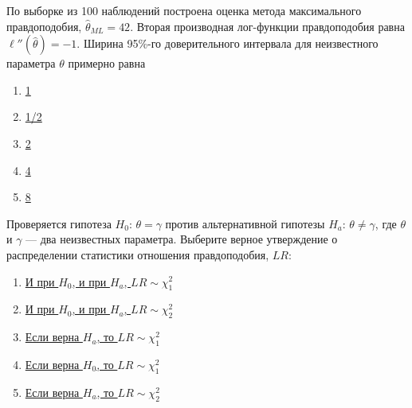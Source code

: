 \documentclass[t]{beamer}
\begin{document}
 \begin{frame} \label{37} 
\begin{block}{37} 

По выборке из 100 наблюдений построена оценка метода максимального правдоподобия, $\hat \theta_{ML} = 42$. Вторая производная лог-функции правдоподобия равна $\ell''(\hat\theta) = -1$. Ширина 95\%-го доверительного интервала для неизвестного параметра $\theta$ примерно равна
  


 \end{block} 
\begin{enumerate} 
\item[] \hyperlink{37-No}{\beamergotobutton{} 1}
\item[] \hyperlink{37-No}{\beamergotobutton{} 1/2}
\item[] \hyperlink{37-No}{\beamergotobutton{} 2}
\item[] \hyperlink{37-Yes}{\beamergotobutton{} 4}
\item[] \hyperlink{37-No}{\beamergotobutton{} 8}
\end{enumerate} 
\end{frame} 


 \begin{frame} \label{38} 
\begin{block}{38} 

  Проверяется гипотеза $H_0$: $\theta = \gamma$ против альтернативной гипотезы $H_a$: $\theta \neq \gamma$, где $\theta$ и $\gamma$ — два неизвестных параметра. Выберите верное утверждение о распределении статистики отношения правдоподобия, $LR$:

  


 \end{block} 
\begin{enumerate} 
\item[] \hyperlink{38-No}{\beamergotobutton{} И при $H_0$, и при $H_a$, $LR \sim \chi_1^2$}
\item[] \hyperlink{38-No}{\beamergotobutton{} И при $H_0$, и при $H_a$, $LR \sim \chi_2^2$}
\item[] \hyperlink{38-No}{\beamergotobutton{} Если верна $H_a$, то $LR \sim \chi_1^2$}
\item[] \hyperlink{38-Yes}{\beamergotobutton{} Если верна $H_0$, то $LR \sim \chi_1^2$}
\item[] \hyperlink{38-No}{\beamergotobutton{} Если верна $H_a$, то $LR \sim \chi_2^2$}
\end{enumerate} 
\end{frame} 
\end{document}
